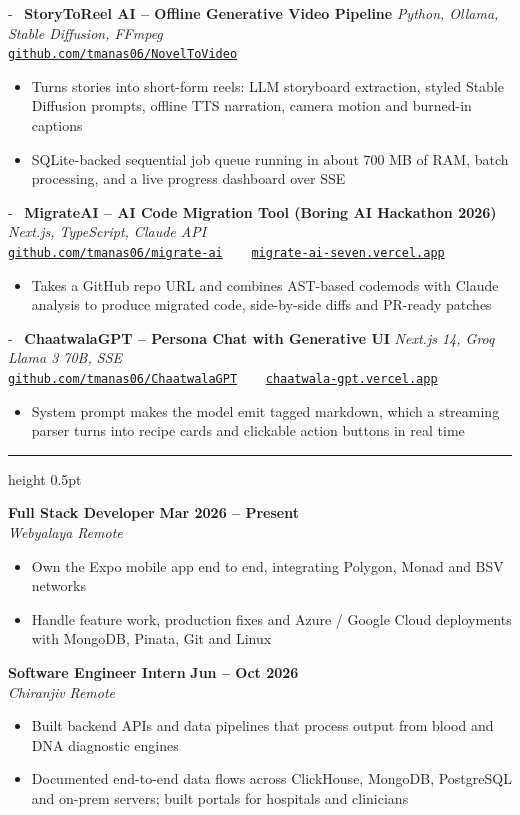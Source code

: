 \documentclass[11pt,a4paper]{article}
\makeatletter
\newcommand{\needspace}[1]{\par\penalty-100\begingroup\setlength{\dimen@}{#1}%
  \dimen@ii\pagegoal\advance\dimen@ii-\pagetotal
  \ifdim\dimen@>\dimen@ii\ifdim\dimen@ii>\z@\vfil\fi\break\fi\endgroup}
\newcommand{\cvsection}[1]{%
  \vspace{6pt}%
  \noindent{\large\textbf{\MakeUppercase{#1}}}%
  \vspace{2pt}%
  \hrule height 0.5pt%
  \vspace{4pt}%
}
\newcommand{\job}[4]{%
  \noindent \textbf{#1} \hfill \textbf{#2} \\
  \textit{#3} \hfill \textit{#4}%
}
\newenvironment{cvitems}{%
  \begin{itemize}[leftmargin=1.5em, itemsep=1pt, parsep=0pt, topsep=1.5pt]%
}{%
  \end{itemize}\vspace{2.5pt}%
}
\newcommand{\projectentry}[4]{%
  \par\needspace{4\baselineskip}\noindent
  \faGithub\ \textbf{#1} \hfill \textit{#2} \\
  {\small\texttt{#3}}
  \begin{itemize}[leftmargin=1.5em, itemsep=0.5pt, parsep=0pt, topsep=1pt]
    #4
  \end{itemize}
  \vspace{2pt}
}
\makeatother
\begin{document}
\projectentry{StoryToReel AI -- Offline Generative Video Pipeline}%
  {Python, Ollama, Stable Diffusion, FFmpeg}%
  {\href{https://github.com/tmanas06/NovelToVideo}{github.com/tmanas06/NovelToVideo}}%
  {\item Turns stories into short-form reels: LLM storyboard extraction, styled Stable Diffusion prompts, offline TTS narration, camera motion and burned-in captions
   \item SQLite-backed sequential job queue running in about 700 MB of RAM, batch processing, and a live progress dashboard over SSE}

\projectentry{MigrateAI -- AI Code Migration Tool (Boring AI Hackathon 2026)}%
  {Next.js, TypeScript, Claude API}%
  {\href{https://github.com/tmanas06/migrate-ai}{github.com/tmanas06/migrate-ai} \ \textbar\ \ \href{https://migrate-ai-seven.vercel.app}{migrate-ai-seven.vercel.app}}%
  {\item Takes a GitHub repo URL and combines AST-based codemods with Claude analysis to produce migrated code, side-by-side diffs and PR-ready patches}

\projectentry{ChaatwalaGPT -- Persona Chat with Generative UI}%
  {Next.js 14, Groq Llama 3 70B, SSE}%
  {\href{https://github.com/tmanas06/ChaatwalaGPT}{github.com/tmanas06/ChaatwalaGPT} \ \textbar\ \ \href{https://chaatwala-gpt.vercel.app}{chaatwala-gpt.vercel.app}}%
  {\item System prompt makes the model emit tagged markdown, which a streaming parser turns into recipe cards and clickable action buttons in real time}

\cvsection{Experience}

\job{Full Stack Developer}{Mar 2026 -- Present}{Webyalaya}{Remote}
\begin{cvitems}
  \item Own the Expo mobile app end to end, integrating Polygon, Monad and BSV networks
  \item Handle feature work, production fixes and Azure / Google Cloud deployments with MongoDB, Pinata, Git and Linux
\end{cvitems}

\job{Software Engineer Intern}{Jun -- Oct 2026}{Chiranjiv}{Remote}
\begin{cvitems}
  \item Built backend APIs and data pipelines that process output from blood and DNA diagnostic engines
  \item Documented end-to-end data flows across ClickHouse, MongoDB, PostgreSQL and on-prem servers; built portals for hospitals and clinicians
\end{cvitems}
\end{document}
